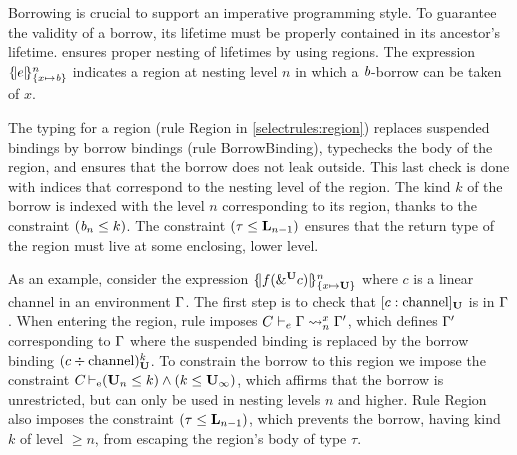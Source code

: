

Borrowing is crucial to support an imperative programming style.
To guarantee the validity of a borrow, its lifetime must be properly contained in its
ancestor's lifetime. \lang ensures proper nesting of lifetimes by using
regions. The expression $\region{\Sone x\BORROW}{e}$ indicates a
region at nesting level $n$ in which a $\BORROW$-borrow can be taken of $x$.

The typing for a region (rule {\sc Region} in \cref{selectrules:region})
replaces suspended bindings by borrow bindings
(rule {\sc BorrowBinding}), typechecks the body
of the region, and ensures that the borrow does not leak outside.
This last check is done with indices that correspond to the nesting
level of the region. The kind $k$ of the borrow is indexed with the level $n$
corresponding to its region, thanks to the constraint $(\BORROW_n\lk
k)$. The constraint $\Cleq{\tau}{\klin_{n-1}}$ ensures that
the return type of the region must live at some enclosing, lower level.

As an example, consider the expression $\region{\Sone x\IBORROW}{f(\borrow[\IBORROW]{c})}$
where $c$ is a linear channel in an environment $\E$.
The first step is to check that $\svar[\IBORROW]{c}{\text{channel}}$
is in $\E$.
When entering the region, rule  imposes
$\lregion{C}{x}{\E}{\E'}$, which defines $\E'$
corresponding to $\E$ where the suspended binding is replaced by the
borrow binding  $\bbvar[\IBORROW]{c}{k}{\text{channel}}$.
To constrain the borrow to this region we impose the constraint
$\entail{C}{(\kun_n\lk k) \wedge (k \lk\kun_\infty)}$, which affirms
that the borrow is unrestricted, but can only be used in nesting
levels $n$ and higher.
%
%
Rule {\sc Region} also imposes the constraint
$\Cleq{\tau}{\klin_{n-1}}$, which prevents the borrow, having kind $k$ of level
$\geq n$, from escaping the region's body of type $\tau$.


